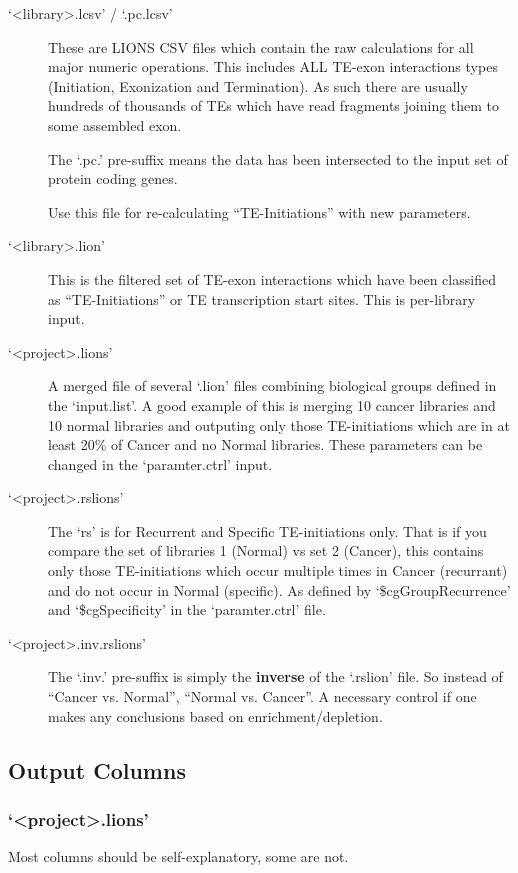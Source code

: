 \documentclass[11pt]{scrartcl}
\newcommand{\arrows}[1]{\textless #1\textgreater}
\begin{document}
\begin{description}
\item[`\arrows{library}.lcsv' / `.pc.lcsv']
  These are LIONS CSV files which contain the raw calculations for all major
  numeric operations.
  This includes ALL TE-exon interactions types (Initiation, Exonization and
  Termination). As such there are usually hundreds of thousands of TEs which
  have read fragments joining them to some assembled exon.

  The `.pc.' pre-suffix means the data has been intersected to the input
  set of protein coding genes.

  Use this file for re-calculating ``TE-Initiations'' with new parameters.

\item[`\arrows{library}.lion']
  This is the filtered set of TE-exon interactions which have been classified
  as ``TE-Initiations'' or TE transcription start sites. This is per-library
  input.

\item[`\arrows{project}.lions'] A merged file of several `.lion' files combining biological groups defined in the `input.list'. A good example of this is merging 10 cancer libraries and 10 normal libraries and outputing only those TE-initiations which are in at least 20\% of Cancer and no Normal libraries. These parameters can be changed in the `paramter.ctrl' input.

\item[`\arrows{project}.rslions'] The `rs' is for Recurrent and Specific TE-initiations only. That is if you   compare the set of libraries 1 (Normal) vs set 2 (Cancer), this contains only those TE-initiations which occur multiple times in Cancer (recurrant) and do not occur in Normal (specific). As defined by `\$cgGroupRecurrence' and `\$cgSpecificity' in the `paramter.ctrl' file.

\item[`\arrows{project}.inv.rslions'] The `.inv.' pre-suffix is simply the \textbf{inverse} of the `.rslion' file. So instead of ``Cancer vs. Normal'', ``Normal vs. Cancer''. A necessary control if one makes any conclusions based on enrichment/depletion.
\end{description}

\subsection{Output Columns}

\subsubsection{`\arrows{project}.lions'}
Most columns should be self-explanatory, some are not.
\end{document}
